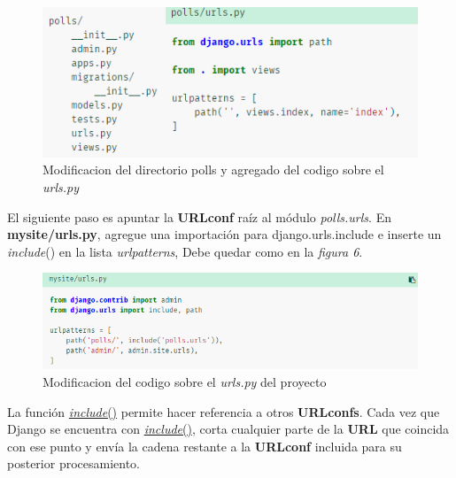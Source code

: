 \documentclass[10pt]{article}
\newcommand{\django}[1]{{\textcolor{G}{Django} #1}}
\begin{document}
\begin{figure}[H]
  \begin{center}
  	 \includegraphics{figuras/314/img2.png}	 
	 \renewcommand{\arraystretch}{1.3}
	 \caption{Modificacion del directorio polls y agregado del codigo sobre el \textit{urls.py}}
  \end{center}
\end{figure}

El siguiente paso es apuntar la \textbf{URLconf} raíz al módulo \textit{polls.urls}. En \textbf{mysite/urls.py}, agregue una importación para \textcolor{G}{django.urls.include} e inserte un \textcolor{B}{\textit{include}}() en la lista \textit{urlpatterns}, Debe quedar como en la \textit{figura 6}.

\begin{figure}[H]
  \begin{center}
  	 \includegraphics{figuras/314/img3.png}	 
	 \renewcommand{\arraystretch}{1.3}
	 \caption{Modificacion del codigo sobre el \textit{urls.py} del proyecto}
  \end{center}
\end{figure}

La función {\href{https://docs.djangoproject.com/en/3.0/ref/urls/#django.urls.include}{\textcolor{B}{\textit{include}}()}} permite hacer referencia a otros \textbf{URLconfs}. Cada vez que \django{} se encuentra con {\href{https://docs.djangoproject.com/en/3.0/ref/urls/#django.urls.include}{\textcolor{B}{\textit{include}}()}}, corta cualquier parte de la \textbf{URL} que coincida con ese punto y envía la cadena restante a la \textbf{URLconf} incluida para su posterior procesamiento.
\end{document}
